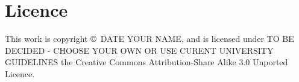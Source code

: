 \chapter*{Licence}
This work is copyright \copyright \ DATE YOUR NAME, and is licensed under TO BE DECIDED - CHOOSE YOUR OWN OR USE CURENT UNIVERSITY GUIDELINES the Creative Commons Attribution-Share Alike 3.0 Unported 
Licence. 
\begin{center}

    
\end{center}